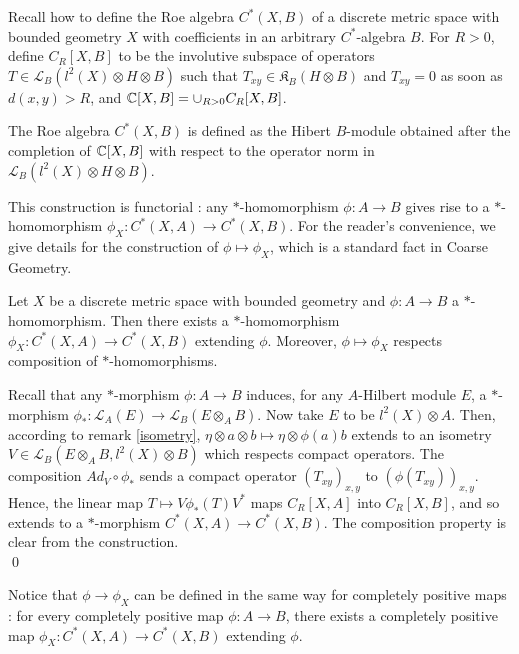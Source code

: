 Recall how to define the Roe algebra $C^*(X,B)$ of a discrete metric space with bounded geometry $X$ with coefficients in an arbitrary $C^*$-algebra $B$. For $R>0$, define $C_R[X,B]$ to be the involutive subspace of operators $T\in \mathcal L_B(l^2(X)\otimes H\otimes B)$ such that $T_{xy}\in \mathfrak K_B(H\otimes B)$ and $T_{xy}=0$ as soon as $d(x,y)>R$, and $\mathbb C[X,B]= \cup_{R>0} C_R[X,B]$. 

\begin{definition}
The Roe algebra $C^*(X,B)$ is defined as the Hibert $B$-module obtained after the completion of $\mathbb C[X,B]$ with respect to the operator norm in $\mathcal L_B(l^2(X)\otimes H\otimes B)$.
\end{definition} 
This construction is functorial : any $*$-homomorphism $\phi: A\rightarrow B$ gives rise to a $*$-homomorphism $\phi_X : C^*(X,A)\rightarrow C^*(X,B)$. For the reader's convenience, we give details for the construction of $\phi\mapsto \phi_X$, which is a standard fact in Coarse Geometry.

\begin{thm}\label{Xfunctor}
Let $X$ be a discrete metric space with bounded geometry and $\phi : A\rightarrow B$ a $*$-homomorphism. Then there exists a $*$-homomorphism $\phi_X : C^*(X,A)\rightarrow C^*(X,B)$ extending $\phi$. Moreover, $\phi\mapsto \phi_X$ respects composition of $*$-homomorphisms.
\end{thm}

\begin{dem}
Recall that any $*$-morphism $\phi : A\rightarrow B$ induces, for any $A$-Hilbert module $E$, a $*$-morphism $\phi_* : \mathcal L_A(E)\rightarrow \mathcal L_B(E\otimes_A B)$. Now take $E$ to be $l^2(X)\otimes A$. Then, according to remark \ref{isometry}, $\eta\otimes a\otimes b\mapsto \eta \otimes\phi(a) b $ extends to an isometry $V\in \mathcal L_B(E\otimes_A B,l^2(X)\otimes B)$ which respects compact operators. The composition $Ad_V\circ\phi_*$ sends a compact operator $(T_{xy})_{x,y}$ to $(\phi(T_{xy}))_{x,y}$.\\

Hence, the linear map $T \mapsto V\phi_*(T)V^*$ maps $C_R[X,A]$ into $C_R[X,B]$, and so extends to a $*$-morphism $C^*(X,A)\rightarrow C^*(X,B)$. The composition property is clear from the construction.\\
\qed
\end{dem}

\begin{rk}
Notice that $\phi\rightarrow \phi_X$ can be defined in the same way for completely positive maps : for every completely positive map $\phi: A \rightarrow B$, there exists a completely positive map $\phi_X : C^*(X,A)\rightarrow C^*(X,B)$ extending $\phi$.
\end{rk}

